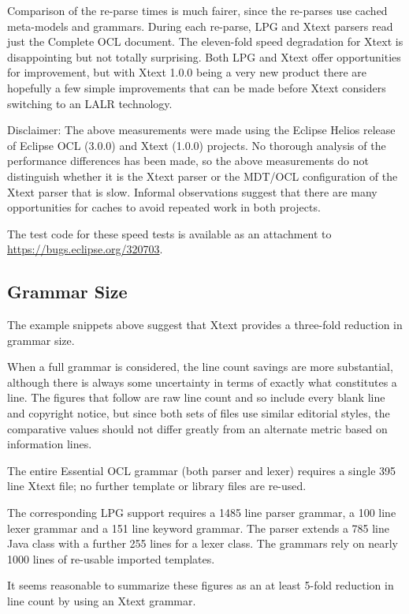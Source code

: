 \documentclass{eceasst}
\begin{document}
Comparison of the re-parse times is much fairer, since the re-parses use cached meta-models and grammars. During each re-parse, LPG and Xtext parsers read just the Complete OCL document. The eleven-fold speed degradation for Xtext is disappointing but not totally surprising. Both LPG and Xtext offer opportunities for improvement, but with Xtext 1.0.0 being a very new product there are hopefully a few simple improvements that can be made before Xtext considers switching to an LALR technology.

Disclaimer: The above measurements were made using the Eclipse Helios release of Eclipse OCL (3.0.0) and Xtext (1.0.0) projects. No thorough analysis of the performance differences has been made, so the above measurements do not distinguish whether it is the Xtext parser or the MDT/OCL configuration of the Xtext parser that is slow. Informal observations suggest that there are many opportunities for caches to avoid repeated work in both projects.

The test code for these speed tests is available as an attachment to \url{https://bugs.eclipse.org/320703}.

\subsection{Grammar Size}

The example snippets above suggest that Xtext provides a three-fold reduction in grammar size.

When a full grammar is considered, the line count savings are more substantial, although there is always some uncertainty in terms of exactly what constitutes a line. The figures that follow are raw line count and so include every blank line and copyright notice, but since both sets of files use similar editorial styles, the comparative values should not differ greatly from an alternate metric based on information lines.

The entire Essential OCL grammar (both parser and lexer) requires a single 395 line Xtext file; no further template or library files are re-used.

The corresponding LPG support requires a 1485 line parser grammar, a 100 line lexer grammar and a 151 line keyword grammar. The parser extends a 785 line Java class with a further 255 lines for a lexer class. The grammars rely on nearly 1000 lines of re-usable imported templates.

It seems reasonable to summarize these figures as an at least 5-fold reduction in line count by using an Xtext grammar.
\end{document}
